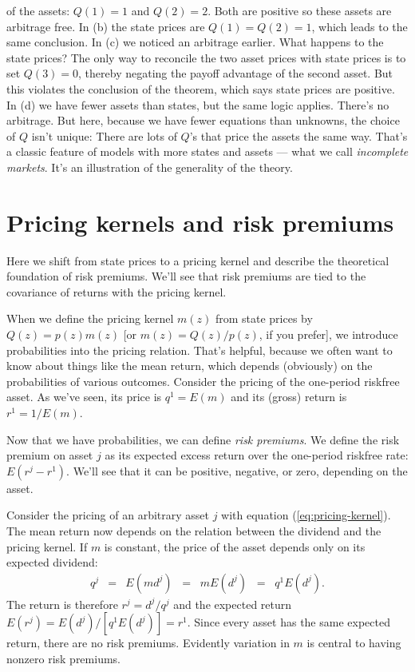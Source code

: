 \documentclass[11pt]{article}
\begin{document}
of the assets:  $Q(1) = 1$ and $Q(2) = 2$.
Both are positive so these assets are arbitrage free.
In (b) the state prices are $Q(1) = Q(2) = 1$, which leads to the same conclusion.
In (c) we noticed an arbitrage earlier.
What happens to the state prices?
The only way to reconcile the two asset prices with state prices is to set $Q(3) = 0$,
thereby negating the payoff advantage of the second asset.
But this violates the conclusion of the theorem, which says state prices are positive.
In (d) we have fewer assets than states, but the same logic applies.
There's no arbitrage.
But here, because we have fewer equations than unknowns,
the choice of $Q$ isn't unique:
There are lots of $Q$'s that price the assets the same way.
That's a classic feature of models with more states and assets ---
what we call {\it incomplete markets\/}.
It's an illustration of the generality of the theory.



\section{Pricing kernels and risk premiums}

Here we shift from state prices to a pricing kernel
and describe the theoretical foundation of risk premiums.
We'll see that risk premiums are tied to the covariance of returns with the pricing kernel.

When we define the pricing kernel $m(z)$ from state prices by $Q(z) = p(z) m(z)$
[or $ m(z) = Q(z)/p(z) $, if you prefer],
we introduce probabilities into the pricing relation.
That's helpful, because we often want to know about things like the mean
return, which depends (obviously) on the probabilities of various outcomes.
Consider the pricing of the one-period riskfree asset.
As we've seen, its price is $q^1 = E(m)$ and its (gross) return is $r^1 = 1/E(m)$.

Now that we have probabilities, we can define {\it risk premiums\/}.
We define the risk premium on asset $j$ as its expected excess return
over the one-period riskfree rate:
$ E(r^j - r^1)$.
We'll see that it can be positive, negative, or zero, depending on the asset.

Consider the pricing of an arbitrary asset $j$ with equation (\ref{eq:pricing-kernel}).
The mean return now depends on the relation between the dividend and the pricing kernel.
If $m$ is constant, the price of the asset depends only on its expected dividend:
\begin{eqnarray*}
    q^j &=& E (m d^j) \;\;=\;\; m E(d^j) \;\;=\;\; q^1 E(d^j) .
\end{eqnarray*}
The return is therefore
$r^j = d^j/q^j$ and the expected return $E(r^j) = E(d^j)/[q^1 E(d^j)] = r^1$.
Since every asset has the same expected return, there are no risk premiums.
Evidently variation in $m$ is central to having nonzero risk premiums.
\end{document}
